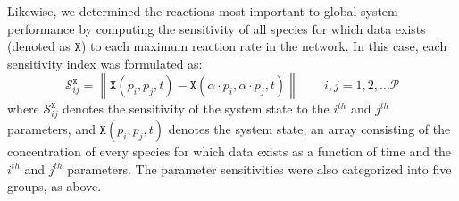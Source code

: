 \documentclass[12pt]{article}
\newcommand{\norm}[1]{\left\lVert#1\right\rVert}
\begin{document}
Likewise, we determined the reactions most important to global system performance by computing the sensitivity of all species for which data exists (denoted as $\texttt{X}$)
to each maximum reaction rate in the network.
In this case, each sensitivity index was formulated as:
\begin{equation}\label{eqn:system-sensitivity}
    \mathcal{S}_{ij}^{\texttt{X}}=\norm{\texttt{X}(p_i,p_j,t)-\texttt{X}(\alpha \cdot p_i,\alpha \cdot p_j,t)}\qquad{i,j=1,2,\hdots\mathcal{P}}
\end{equation}
where $\mathcal{S}_{ij}^{\texttt{X}}$ denotes the sensitivity of the system state to the $i^{th}$ and $j^{th}$ parameters,
and $\texttt{X}(p_i,p_j,t)$ denotes the system state, an array consisting of the concentration of every species for
which data exists as a function of time and the $i^{th}$ and $j^{th}$ parameters.
The parameter sensitivities were also categorized into five groups, as above.

\end{document}
